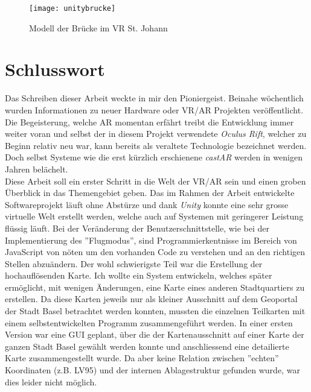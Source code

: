  \begin{figure}[ht]
 	\vspace{-20pt}
 	\begin{center}
 		\texttt{[image: unitybrucke]}
 	\end{center}
 	\vspace{-15pt}
 	\caption{Modell der Brücke im VR St. Johann}\label{unitybrücke}
 	\vspace{-12pt}
 \end{figure}

\chapter{Schlusswort}\label{c.zusammenfassung}
\vspace{-20pt}
Das Schreiben dieser Arbeit weckte in mir den Pioniergeist. Beinahe wöchentlich wurden Informationen zu neuer Hardware oder VR/AR Projekten veröffentlicht. Die Begeisterung, welche AR momentan erfährt treibt die Entwicklung immer weiter voran und selbst der in diesem Projekt verwendete \textit{Oculus Rift}, welcher zu Beginn relativ neu war, kann bereits als veraltete Technologie bezeichnet werden. Doch selbst Systeme wie die erst kürzlich erschienene \textit{castAR} werden in wenigen Jahren belächelt.\\[6pt] 
Diese Arbeit soll ein erster Schritt in die Welt der VR/AR sein und einen groben Überblick in das Themengebiet geben. Das im Rahmen der Arbeit entwickelte Softwareprojekt läuft ohne Abstürze und dank \textit{Unity} konnte eine sehr grosse virtuelle Welt erstellt werden, welche auch auf Systemen mit geringerer Leistung flüssig läuft. Bei der Veränderung der Benutzerschnittstelle, wie bei der Implementierung des ''Flugmodus'', sind Programmierkentnisse im Bereich von JavaScript von nöten um den vorhanden Code zu verstehen und an den richtigen Stellen abzuändern. Der wohl schwierigste Teil war die Erstellung der hochauflösenden Karte. Ich wollte ein System entwickeln, welches später ermöglicht, mit wenigen Änderungen, eine Karte eines anderen Stadtquartiers zu erstellen. Da diese Karten jeweils nur als kleiner Ausschnitt auf dem Geoportal der Stadt Basel betrachtet werden konnten, mussten die einzelnen Teilkarten mit einem selbstentwickelten Programm zusammengeführt werden. In einer ersten Version war eine GUI geplant, über die der Kartenausschnitt auf einer Karte der ganzen Stadt Basel gewählt werden konnte und anschliessend eine detailierte Karte zusammengestellt wurde. Da aber keine Relation zwischen ''echten'' Koordinaten (z.B. LV95) und der internen Ablagestruktur gefunden wurde, war dies leider nicht möglich.\\[6pt]
